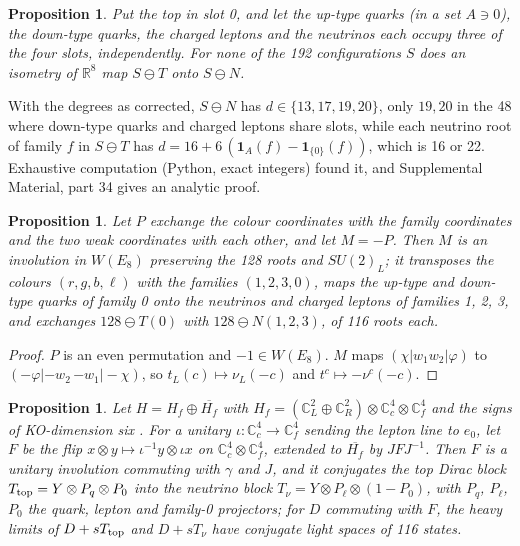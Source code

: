 \documentclass[aps,prd,reprint,onecolumn,nofootinbib,amsmath,amssymb,floatfix]{revtex4-2}
\theoremstyle{plain}
\newtheorem{proposition}[theorem]{Proposition}
\newcommand{\C}{\mathbb C}
\newcommand{\R}{\mathbb R}
\newcommand{\supp}[1]{Supplemental Material, part #1}
\begin{document}
\begin{proposition}\label{prop:slots}
Put the top in slot 0, and let the up-type quarks (in a set $A\ni0$), the down-type quarks, the charged leptons and the neutrinos each occupy three of the four slots, independently. For none of the 192 configurations $S$ does an isometry of $\R^8$ map $S\ominus T$ onto $S\ominus N$.
\end{proposition}

With the degrees as corrected, $S\ominus N$ has $d\in\{13,17,19,20\}$, only $19,20$ in the 48 where down-type quarks and charged leptons share slots, while each neutrino root of family $f$ in $S\ominus T$ has $d=16+6\,(\mathbf 1_A(f)-\mathbf 1_{\{0\}}(f))$, which is 16 or 22. Exhaustive computation (Python, exact integers) found it, and \supp{34} gives an analytic proof.

\begin{proposition}\label{prop:M}
Let $P$ exchange the colour coordinates with the family coordinates and the two weak coordinates with each other, and let $M=-P$. Then $M$ is an involution in $W(E_8)$ preserving the 128 roots and $SU(2)_L$; it transposes the colours $(r,g,b,\ell)$ with the families $(1,2,3,0)$, maps the up-type and down-type quarks of family 0 onto the neutrinos and charged leptons of families 1, 2, 3, and exchanges $128\ominus T(0)$ with $128\ominus N(1,2,3)$, of 116 roots each.
\end{proposition}

\begin{proof}
$P$ is an even permutation and $-1\in W(E_8)$. $M$ maps $(\chi|w_1w_2|\varphi)$ to $(-\varphi|{-w_2}\,{-w_1}|-\chi)$, so $t_L(c)\mapsto\nu_L(-c)$ and $t^c\mapsto-\nu^c(-c)$.
\end{proof}

\begin{proposition}\label{prop:flip}
Let $H=H_f\oplus\overline{H_f}$ with $H_f=(\C^2_L\oplus\C^2_R)\otimes\C^4_c\otimes\C^4_f$ and the signs of KO-dimension six \cite{Connes2006}. For a unitary $\iota:\C^4_c\to\C^4_f$ sending the lepton line to $e_0$, let $F$ be the flip $x\otimes y\mapsto\iota^{-1}y\otimes\iota x$ on $\C^4_c\otimes\C^4_f$, extended to $\overline{H_f}$ by $JFJ^{-1}$. Then $F$ is a unitary involution commuting with $\gamma$ and $J$, and it conjugates the top Dirac block $T_{\rm top}=Y\otimes P_q\otimes P_0$ into the neutrino block $T_\nu=Y\otimes P_\ell\otimes(1-P_0)$, with $P_q$, $P_\ell$, $P_0$ the quark, lepton and family-0 projectors; for $D$ commuting with $F$, the heavy limits of $D+sT_{\rm top}$ and $D+sT_\nu$ have conjugate light spaces of 116 states.
\end{proposition}
\end{document}
